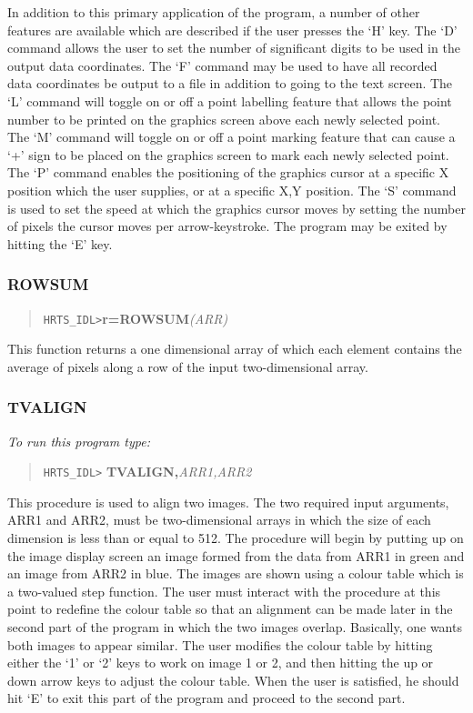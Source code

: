 In addition to this primary application of the program, a number of other
features are available which are described if the user presses the `H' key.
The `D' command allows the user to set the number of significant digits to be
used in the output data coordinates.  The `F' command may be used to have all
recorded data coordinates be output to a file in addition to going to the text
screen.  The `L' command will toggle on or off a point labelling feature that
allows the point number to be printed on the graphics screen above each newly
selected point.  The `M' command will toggle on or off a point marking feature
that can cause a `+' sign to be placed on the graphics screen to mark each
newly selected point.  The `P' command enables the positioning of the graphics
cursor at a specific X position which the user supplies, or at a specific X,Y
position.  The `S' command is used to set the speed at which the graphics
cursor moves by setting the number of pixels the cursor moves per
arrow-keystroke. The program may be exited by hitting the `E' key.

\subsubsection{ROWSUM}

\begin{quote}
     {\tt HRTS\_IDL>}{\bf r=ROWSUM}{\it (ARR)}
\end{quote}
This function returns a one dimensional array of which each element contains
the average of pixels along a row of the input  two-dimensional array.

\subsubsection{TVALIGN}

{\em To run this program type:}
\begin{quote}
     {\tt HRTS\_IDL>} {\bf TVALIGN,}{\it ARR1,ARR2}
\end{quote}

This procedure is used to align two images.  The two required input arguments,
ARR1 and ARR2, must be two-dimensional arrays in which the size of each
dimension is less than or equal to 512. The procedure will begin by putting up
on the image display screen an  image formed from the data from ARR1 in green
and an image from ARR2 in blue. The images are shown using a colour table which
is a two-valued step function.  The user must interact with the procedure at
this point to redefine the colour table so that an alignment can be made later
in the second part of the program in which the two images overlap.  Basically,
one wants both images to appear similar.  The user modifies the colour table by
hitting either the `1' or `2' keys to work on image 1 or 2, and then hitting
the up or down arrow keys to adjust the colour table. When the user is
satisfied, he should hit `E' to exit this part of the program and proceed to
the second part.

